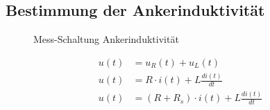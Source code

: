 \subsection{Bestimmung der Ankerinduktivität}


\begin{figure}[H]
    \centering
    \caption{Mess-Schaltung Ankerinduktivität}
    \label{fig:PlotAufgabe1}
   \end{figure}


\begin{equation} \label{eq211}
    \begin{split}
        u(t)&=u_R(t) + u_L(t)\\
        u(t)&=R \cdot i(t) + L \frac{d i(t)}{dt}\\
        u(t)&= (R+R_s) \cdot i(t) + L \frac{d i(t)}{dt}
    \end{split}
\end{equation}

